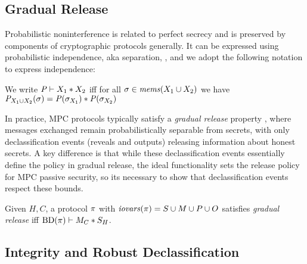 \subsection{Gradual Release}

Probabilistic noninterference is related to perfect secrecy and is
preserved by components of cryptographic protocols generally. It can
be expressed using probabilistic independence, aka separation,
\cite{darais2019language,barthe2019probabilistic}, and we adopt the
following notation to express independence:
\begin{definition}
  We write $\mathit{P} \vdash X_1 * X_2$ iff for all
    $\sigma \in \mathit{mems}(X_1 \cup X_2)$ we have
  ${\mathit{P}}_{X_1 \cup X_2}(\sigma) =
  \mathit{P}(\sigma_{X_1}) * \mathit{P}(\sigma_{X_2})$
\end{definition}

In practice, MPC protocols typically satisfy a \emph{gradual
release} property \cite{sabelfeld2009declassification}, where messages
exchanged remain probabilistically separable from secrets, with only
declassification events (reveals and outputs) releasing information
about honest secrets.  A key difference is that while these
declassification events essentially define the policy in gradual
release, the ideal functionality sets the release policy for MPC
passive security, so its necessary to show that declassification
events respect these bounds.
\begin{definition}
  Given $H,C$, a protocol $\pi$ with $\mathit{iovars}(\pi) = S \cup M \cup P \cup O$
  satisfies \emph{gradual release} iff
  $\mathrm{BD}(\pi) \vdash M_C * S_H$.
\end{definition}

\subsection{Integrity and Robust Declassification}


